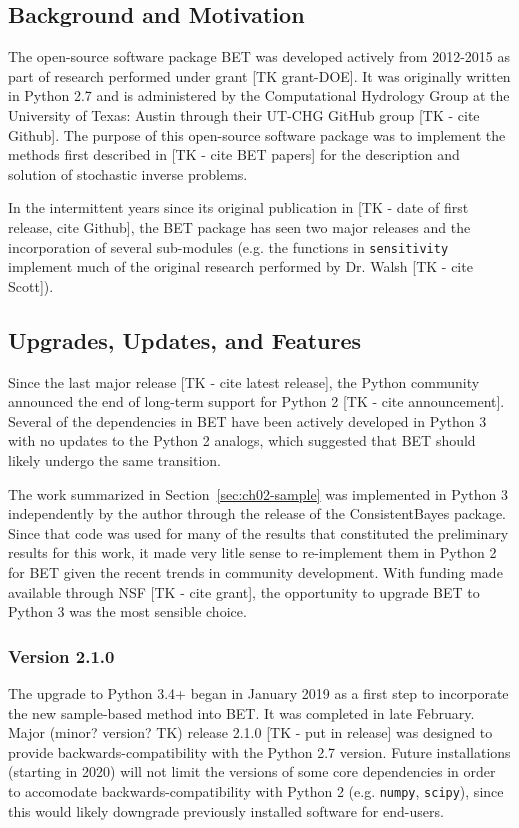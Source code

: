 \subsection{Background and Motivation}
The open-source software package BET was developed actively from 2012-2015 as part of research performed under grant [TK grant-DOE].
It was originally written in Python 2.7 and is administered by the Computational Hydrology Group at the University of Texas: Austin through their UT-CHG GitHub group [TK - cite Github].
The purpose of this open-source software package was to implement the methods first described in [TK - cite BET papers] for the description and solution of stochastic inverse problems.

In the intermittent years since its original publication in [TK - date of first release, cite Github], the BET package has seen two major releases and the incorporation of several sub-modules (e.g. the functions in {\tt sensitivity} implement much of the original research performed by Dr. Walsh [TK - cite Scott]).


\subsection{Upgrades, Updates, and Features}
Since the last major release [TK - cite latest release], the Python community announced the end of long-term support for Python 2 [TK - cite announcement].
Several of the dependencies in BET have been actively developed in Python 3 with no updates to the Python 2 analogs, which suggested that BET should likely undergo the same transition.

The work summarized in Section~\ref{sec:ch02-sample} was implemented in Python 3 independently by the author through the release of the ConsistentBayes package.
Since that code was used for many of the results that constituted the preliminary results for this work, it made very litle sense to re-implement them in Python 2 for BET given the recent trends in community development.
With funding made available through NSF [TK - cite grant], the opportunity to upgrade BET to Python 3 was the most sensible choice.


\subsubsection{Version 2.1.0}
The upgrade to Python 3.4+ began in January 2019 as a first step to incorporate the new sample-based method into BET.
It was completed in late February.
Major (minor? version? TK) release 2.1.0 [TK - put in release] was designed to provide backwards-compatibility with the Python 2.7 version.
Future installations (starting in 2020) will not limit the versions of some core dependencies in order to accomodate backwards-compatibility with Python 2 (e.g. {\tt numpy}, {\tt scipy}), since this would likely downgrade previously installed software for end-users.


